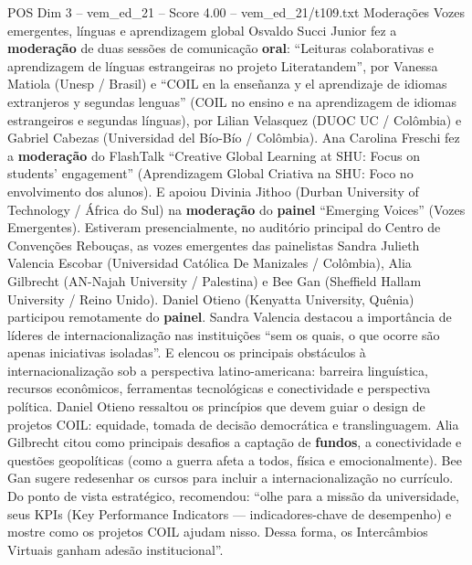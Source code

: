 \begin{textsample}{POS Dim 3 – vem\_ed\_21 – Score 4.00 – vem\_ed\_21/t109.txt}  \label{ex:f3_pos_107}
Moderações Vozes emergentes, línguas e aprendizagem global Osvaldo Succi Junior fez a \textbf{moderação} de duas sessões de comunicação \textbf{oral}: “Leituras colaborativas e aprendizagem de línguas estrangeiras no projeto Literatandem”, por Vanessa Matiola (Unesp / Brasil) e “COIL en la enseñanza y el aprendizaje de idiomas extranjeros y segundas lenguas” (COIL no ensino e na aprendizagem de idiomas estrangeiros e segundas línguas), por Lilian Velasquez (DUOC UC / Colômbia) e Gabriel Cabezas (Universidad del Bío-Bío / Colômbia).
Ana Carolina Freschi fez a \textbf{moderação} do FlashTalk “Creative Global Learning at SHU: Focus on students’ engagement” (Aprendizagem Global Criativa na SHU: Foco no envolvimento dos alunos).
E apoiou Divinia Jithoo (Durban University of Technology / África do Sul) na \textbf{moderação} do \textbf{painel} “Emerging Voices” (Vozes Emergentes).
Estiveram presencialmente, no auditório principal do Centro de Convenções Rebouças, as vozes emergentes das painelistas Sandra Julieth Valencia Escobar (Universidad Católica De Manizales / Colômbia), Alia Gilbrecht (AN-Najah University / Palestina) e Bee Gan (Sheffield Hallam University / Reino Unido).
Daniel Otieno (Kenyatta University, Quênia) participou remotamente do \textbf{painel}.
Sandra Valencia destacou a importância de líderes de internacionalização nas instituições “sem os quais, o que ocorre são apenas iniciativas isoladas”.
E elencou os principais obstáculos à internacionalização sob a perspectiva latino-americana: barreira linguística, recursos econômicos, ferramentas tecnológicas e conectividade e perspectiva política.
Daniel Otieno ressaltou os princípios que devem guiar o design de projetos COIL: equidade, tomada de decisão democrática e translinguagem.
Alia Gilbrecht citou como principais desafios a captação de \textbf{fundos}, a conectividade e questões geopolíticas (como a guerra afeta a todos, física e emocionalmente).
Bee Gan sugere redesenhar os cursos para incluir a internacionalização no currículo.
Do ponto de vista estratégico, recomendou: “olhe para a missão da universidade, seus KPIs (Key Performance Indicators — indicadores-chave de desempenho) e mostre como os projetos COIL ajudam nisso.
Dessa forma, os Intercâmbios Virtuais ganham adesão institucional”.

\end{textsample}

